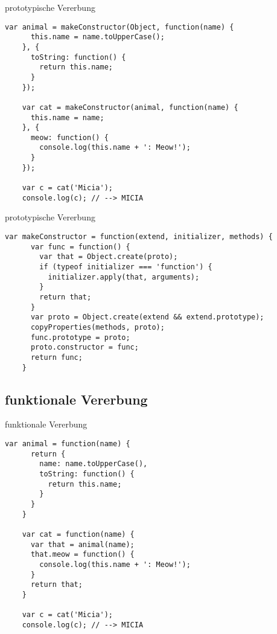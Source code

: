 \begin{frame}[fragile]{prototypische Vererbung}
  \begin{lstlisting}[gobble=4]
    var animal = makeConstructor(Object, function(name) {
      this.name = name.toUpperCase();
    }, {
      toString: function() {
        return this.name;
      }
    });
    
    var cat = makeConstructor(animal, function(name) {
      this.name = name;
    }, {
      meow: function() {
        console.log(this.name + ': Meow!');
      }
    });
    
    var c = cat('Micia');
    console.log(c); // --> MICIA
  \end{lstlisting}
\end{frame}

\begin{frame}[fragile]{prototypische Vererbung}
  \begin{lstlisting}[gobble=4]
    var makeConstructor = function(extend, initializer, methods) {
      var func = function() {
        var that = Object.create(proto);
        if (typeof initializer === 'function') {
          initializer.apply(that, arguments);
        }
        return that;
      }
      var proto = Object.create(extend && extend.prototype);
      copyProperties(methods, proto);
      func.prototype = proto;
      proto.constructor = func;
      return func;
    }
  \end{lstlisting}
\end{frame}

\subsection{funktionale Vererbung}

\begin{frame}[fragile]{funktionale Vererbung}
  \begin{lstlisting}[gobble=4]
    var animal = function(name) {
      return {
        name: name.toUpperCase(),
        toString: function() {
          return this.name;
        }
      }
    }
    
    var cat = function(name) {
      var that = animal(name);
      that.meow = function() {
        console.log(this.name + ': Meow!');
      }
      return that;
    }
    
    var c = cat('Micia');
    console.log(c); // --> MICIA
  \end{lstlisting}
\end{frame}

